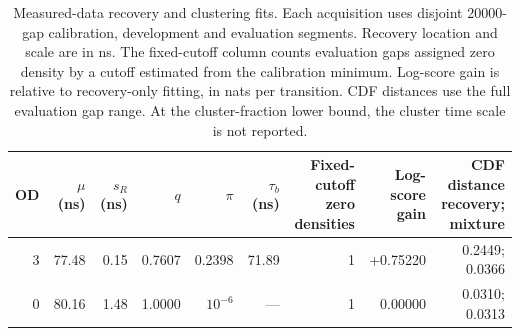 \begin{table}[t]\centering
\caption{Measured-data recovery and clustering fits. Each acquisition uses disjoint 20000-gap calibration, development and evaluation segments. Recovery location and scale are in ns. The fixed-cutoff column counts evaluation gaps assigned zero density by a cutoff estimated from the calibration minimum. Log-score gain is relative to recovery-only fitting, in nats per transition. CDF distances use the full evaluation gap range. At the cluster-fraction lower bound, the cluster time scale is not reported.}
\label{tab:measured}
\begin{tabular}{rrrrrrrrr}\toprule
OD & $\mu$ (ns) & $s_R$ (ns) & $q$ & $\pi$ & $\tau_b$ (ns) & \shortstack{Fixed-cutoff\\zero densities} & \shortstack{Log-score\\gain} & \shortstack{CDF distance\\recovery; mixture}\\\midrule
3 & 77.48 & 0.15 & 0.7607 & 0.2398 & 71.89 & 1 & +0.75220 & 0.2449; 0.0366\\
0 & 80.16 & 1.48 & 1.0000 & $10^{-6}$ & --- & 1 & 0.00000 & 0.0310; 0.0313\\
\bottomrule\end{tabular}\end{table}
